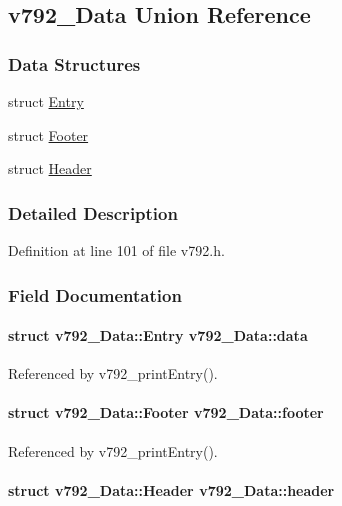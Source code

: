 \subsection{v792\_\-Data Union Reference}
\label{unionv792__Data}
\subsubsection*{Data Structures}
\begin{DoxyCompactItemize}
\item 
struct \hyperlink{structv792__Data_1_1Entry}{Entry}
\item 
struct \hyperlink{structv792__Data_1_1Footer}{Footer}
\item 
struct \hyperlink{structv792__Data_1_1Header}{Header}
\end{DoxyCompactItemize}


\subsubsection{Detailed Description}


Definition at line 101 of file v792.h.

\subsubsection{Field Documentation}
\paragraph[{data}]{\setlength{\rightskip}{0pt plus 5cm}struct {\bf v792\_\-Data::Entry}  {\bf v792\_\-Data::data}}\hfill\label{unionv792__Data_af80542c385e5f816fef3cd9d645b137e}


Referenced by v792\_\-printEntry().
\paragraph[{footer}]{\setlength{\rightskip}{0pt plus 5cm}struct {\bf v792\_\-Data::Footer}  {\bf v792\_\-Data::footer}}\hfill\label{unionv792__Data_ab36f8ebd383e605e88b914afc2a5373e}


Referenced by v792\_\-printEntry().
\paragraph[{header}]{\setlength{\rightskip}{0pt plus 5cm}struct {\bf v792\_\-Data::Header}  {\bf v792\_\-Data::header}}\hfill\label{unionv792__Data_a859f22bbc85672e1d4e897fec61fae38}


